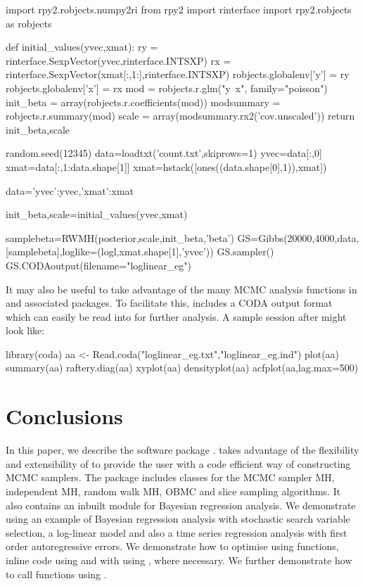 \documentclass[article]{jss}
\begin{document}
\begin{Code}
import rpy2.robjects.numpy2ri
from rpy2 import rinterface
import rpy2.robjects as robjects

def initial_values(yvec,xmat):
    ry = rinterface.SexpVector(yvec,rinterface.INTSXP)
    rx = rinterface.SexpVector(xmat[:,1:],rinterface.INTSXP)
    robjects.globalenv['y'] = ry
    robjects.globalenv['x'] = rx
    mod = robjects.r.glm("y~x", family="poisson")
    init_beta =  array(robjects.r.coefficients(mod))
    modsummary = robjects.r.summary(mod)
    scale = array(modsummary.rx2('cov.unscaled'))
    return init_beta,scale

random.seed(12345) 
data=loadtxt('count.txt',skiprows=1)
yvec=data[:,0]
xmat=data[:,1:data.shape[1]]
xmat=hstack([ones((data.shape[0],1)),xmat])

data={'yvec':yvec,'xmat':xmat} 

init_beta,scale=initial_values(yvec,xmat)

samplebeta=RWMH(posterior,scale,init_beta,'beta')
GS=Gibbs(20000,4000,data, [samplebeta],loglike=(logl,xmat.shape[1],'yvec'))
GS.sampler()
GS.CODAoutput(filename="loglinear_eg") 

\end{Code}


It may also be useful to take advantage of the many MCMC analysis
functions in  and associated packages. To facilitate this,
 includes a CODA
\citep{Rnews:Plummer+Best+Cowles+Vines:2006} output format which can
easily be read into  for further analysis. A sample
 session after  might look like:


\begin{Code}
library(coda)
aa <- Read.coda("loglinear_eg.txt","loglinear_eg.ind")
plot(aa)
summary(aa)
raftery.diag(aa)
xyplot(aa)
densityplot(aa)
acfplot(aa,lag.max=500)

\end{Code}



\section{Conclusions}
\label{sec:Conclusions}

In this paper, we describe the  software
package .   takes advantage of the flexibility
and extensibility of  to provide the user with a code
efficient way of constructing MCMC samplers. The  package
includes classes for the MCMC sampler MH, independent MH, random walk
MH, OBMC and slice sampling algorithms.  It also contains an inbuilt
module for Bayesian regression analysis.  We demonstrate 
using an example of Bayesian regression analysis with stochastic
search variable selection, a log-linear model and also a time series
regression analysis with first order autoregressive errors. We
demonstrate how to optimise  using  functions,
inline  code using  and with
 using , where necessary.  We further
demonstrate how to call  functions using .
\end{document}
